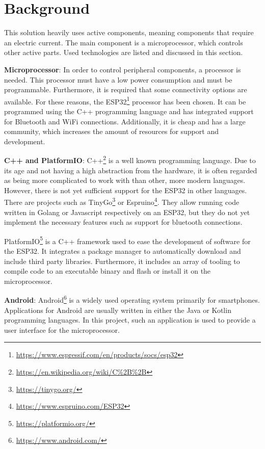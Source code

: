\section{Background}\label{sec:background}

This solution heavily uses active components, meaning components that require an electric current.
The main component is a microprocessor, which controls other active parts.
Used technologies are listed and discussed in this section.

\textbf{Microprocessor}: In order to control peripheral components, a processor is needed.
This processor must have a low power consumption and must be programmable.
Furthermore, it is required that some connectivity options are available.
For these reasons, the ESP32\footnote{\url{https://www.espressif.com/en/products/socs/esp32}} processor has been chosen.
It can be programmed using the C++ programming language and has integrated support for Bluetooth and WiFi connections.
Additionally, it is cheap and has a large community, which increases the amount of resources for support and development.

\textbf{C++ and PlatformIO}: C++\footnote{\url{https://en.wikipedia.org/wiki/C\%2B\%2B}} is a well known programming language.
Due to its age and not having a high abstraction from the hardware, it is often regarded as being more complicated to work with than other, more modern languages.
However, there is not yet sufficient support for the ESP32 in other languages.
There are projects such as TinyGo\footnote{\url{https://tinygo.org/}} or Espruino\footnote{\url{https://www.espruino.com/ESP32}}.
They allow running code written in Golang or Javascript respectively on an ESP32, but they do not yet implement the necessary features such as support for bluetooth connections.

PlatformIO\footnote{\url{https://platformio.org/}} is a C++ framework used to ease the development of software for the ESP32.
It integrates a package manager to automatically download and include third party libraries.
Furthermore, it includes an array of tooling to compile code to an executable binary and flash or install it on the microprocessor.

\textbf{Android}: Android\footnote{\url{https://www.android.com/}} is a widely used operating system primarily for smartphones.
Applications for Android are usually written in either the Java or Kotlin programming languages.
In this project, such an application is used to provide a user interface for the microprocessor.

